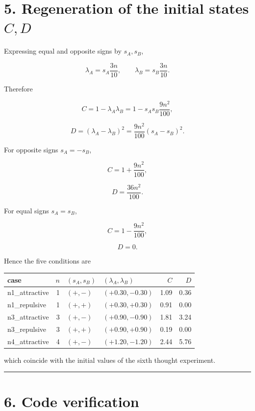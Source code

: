 \documentclass[
  a4paper,
]{article}
\newcounter{none} %
\begin{document}
\section{\texorpdfstring{5. Regeneration of the initial states
\(C,D\)}{5. Regeneration of the initial states C,D}}\label{regeneration-of-the-initial-states-cd}

Expressing equal and opposite signs by \(s_A,s_B\),

\[
\lambda_A=s_A\frac{3n}{10},
\qquad
\lambda_B=s_B\frac{3n}{10}.
\]

Therefore

\[
C
=
1-\lambda_A\lambda_B
=
1-s_As_B\frac{9n^2}{100},
\]

\[
D
=
(\lambda_A-\lambda_B)^2
=
\frac{9n^2}{100}(s_A-s_B)^2.
\]

For opposite signs \(s_A=-s_B\),

\[
C=1+\frac{9n^2}{100},
\]

\[
D=\frac{36n^2}{100}.
\]

For equal signs \(s_A=s_B\),

\[
C=1-\frac{9n^2}{100},
\]

\[
D=0.
\]

Hence the five conditions are

{\def\LTcaptype{none} %
\begin{longtable}[]{@{}lrllrr@{}}
\toprule\noalign{}
case & \(n\) & \((s_A,s_B)\) & \((\lambda_A,\lambda_B)\) & \(C\) &
\(D\) \\
\midrule\noalign{}
\endhead
\bottomrule\noalign{}
\endlastfoot
n1\_attractive & 1 & \((+,-)\) & \((+0.30,-0.30)\) & 1.09 & 0.36 \\
n1\_repulsive & 1 & \((+,+)\) & \((+0.30,+0.30)\) & 0.91 & 0.00 \\
n3\_attractive & 3 & \((+,-)\) & \((+0.90,-0.90)\) & 1.81 & 3.24 \\
n3\_repulsive & 3 & \((+,+)\) & \((+0.90,+0.90)\) & 0.19 & 0.00 \\
n4\_attractive & 4 & \((+,-)\) & \((+1.20,-1.20)\) & 2.44 & 5.76 \\
\end{longtable}
}

which coincide with the initial values of the sixth thought experiment.

\begin{center}\rule{0.5\linewidth}{0.5pt}\end{center}

\section{6. Code verification}\label{code-verification}
\end{document}
